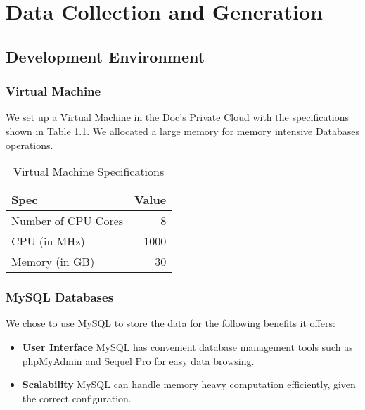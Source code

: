 \chapter{Data Collection and Generation}
\label{ch:data_generation}


\section{Development Environment}
\subsection{Virtual Machine}
\par We set up a Virtual Machine in the Doc's Private Cloud\cite{private_cloud} with the specifications shown in Table \ref{table:virtual_machine}. We allocated a large memory for memory intensive Databases operations.

\begin{table}
\centering
\begin{tabular}{@{}lr@{}} \toprule
Spec & Value \\ \midrule
Number of CPU Cores & 8 \\
CPU (in MHz) & 1000 \\
Memory (in GB) & 30 \\
 \bottomrule
\end{tabular}
\caption{Virtual Machine Specifications}
\label{table:virtual_machine}
\end{table}

\subsection{MySQL Databases}
\par We chose to use MySQL to store the data for the following benefits it offers:

\begin{itemize}
  \item \textbf{User Interface} MySQL has convenient database management tools such as phpMyAdmin\cite{phpmyadmin} and Sequel Pro\cite{sequel_pro} for easy data browsing.
  \item \textbf{Scalability} MySQL can handle memory heavy computation efficiently, given the correct configuration.
\end{itemize}

